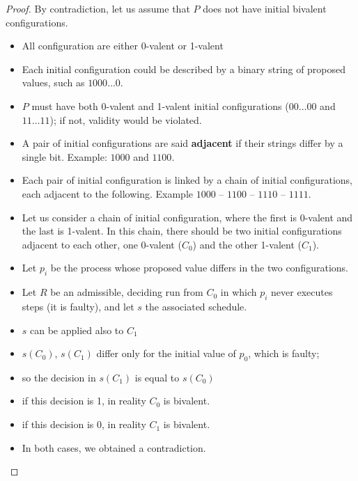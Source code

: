 \documentclass[12pt]{article}
\newcommand{\BI}{\begin{itemize}}
\newcommand{\EI}{\end{itemize}}
\begin{document}
\begin{proof}
By contradiction, let us assume that $P$ does not have initial
bivalent configurations.

\BI
\item All configuration are either 0-valent or 1-valent

\item
Each initial configuration could be described by a binary string of proposed
values, such as $1000\ldots0$.

\item 
$P$ must have both 0-valent and 1-valent initial configurations ($00\ldots00$ and
$11\ldots11$); if not, validity would be violated.


\item 
A pair of initial configurations are said {\bf adjacent} if their strings differ
by a single bit. Example: $1000$ and $1100$.

\item
Each pair of initial configuration is linked by a chain of initial configurations, each adjacent
to the following. Example $1000$ -- $1100$ -- $1110$ -- $1111$.

\item Let us consider a chain of initial configuration, where the first is 
  0-valent and the last is 1-valent. In this chain, there should be
  two initial configurations adjacent to each other, one 0-valent ($C_0$) and 
  the other 1-valent ($C_1$).

\item Let $p_i$ be the process whose proposed value differs in the
  two configurations.

\item Let $R$ be an admissible, deciding run from $C_0$ in which
  $p_i$ never executes steps (it is faulty), and let $s$ the associated
  schedule.
\item $s$ can be applied also to $C_1$
\item $s(C_0)$, $s(C_1)$ differ only for the initial value of $p_0$,
  which is faulty; 
\item so the decision in $s(C_1)$ is equal to $s(C_0)$
\item if this decision is 1, in reality $C_0$ is bivalent.
\item if this decision is 0, in reality $C_1$ is bivalent.
\item In both cases, we obtained a contradiction.
\EI
\end{proof}

\newpage
\end{document}
